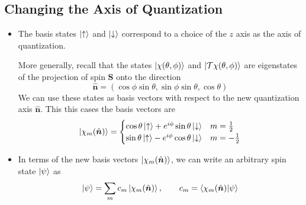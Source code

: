 \documentclass[11pt, a4paper]{article}
\renewcommand{\vec}[1]{\bm{#1}}  %
\newcommand{\uvec}[1]{\hat{\vec{#1}}}  %
\newcommand{\ua}{\uparrow}  %
\newcommand{\da}{\downarrow}  %
\newcommand{\T}{\mathcal{T}}  %
\newcommand{\p}{\psi}  %
\begin{document}
\subsection{Changing the Axis of Quantization}
\begin{itemize}
	\item The basis states $ \ket{\ua} $ and $ \ket{\da} $ correspond to a choice of the $ z $ axis as the axis of quantization. 
	
	More generally, recall that the states $ \ket{\chi(\theta, \phi)}  $ and $ \ket{\T \chi(\theta, \phi)}  $ are eigenstates of the projection of spin $ \vec{S} $ onto the direction
	\begin{equation*}
		\uvec{n} = (\cos \phi \sin \theta, \sin \phi \sin \theta, \cos \theta)
	\end{equation*}
	We can use these states as basis vectors with respect to the new quantization axis $ \uvec{n} $. This this cases the basis vectors are
	\begin{equation*}
		\ket{\chi_{m}(\uvec{n})} = 
		\begin{cases}
			\cos \theta \ket{\ua} + e^{i\phi} \sin \theta \ket{\da} & m = \frac{1}{2}\\
			\sin \theta \ket{\ua} - e^{i\phi} \cos \theta \ket{\da} & m = -\frac{1}{2}
		\end{cases}
	\end{equation*}
	
	\item In terms of the new basis vectors $ \ket{\chi_{m}(\uvec{n})} $, we can write an arbitrary spin state $ \ket{\p} $ as
	\begin{equation*}
		\ket{\p} = \sum_{m} c_{m}\ket{\chi_{m}(\uvec{n})}, \qquad c_{m} =  \braket{\chi_{m}(\uvec{n})}{\p}
	\end{equation*}
	
\end{itemize}
\end{document}
